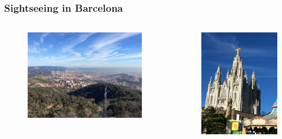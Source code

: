 \documentclass[11pt,
               hyperref={colorlinks,citecolor=pink,linkcolor=red,urlcolor=blue}
               ]{beamer}
\begin{document}
  \begin{frame}
    \frametitle{Sightseeing in Barcelona}

    \begin{columns}
      \begin{column}{0.5\textwidth}
        \begin{figure}
          \centering
          \includegraphics[width=\textwidth]{barc3.jpeg}
        \end{figure}
      \end{column}
      \begin{column}{0.25\textwidth}
        \begin{figure}
          \centering
          \includegraphics[width=\textwidth]{barc1.jpeg}

\end{figure}
\end{column}
\end{columns}
\end{frame}
\end{document}
